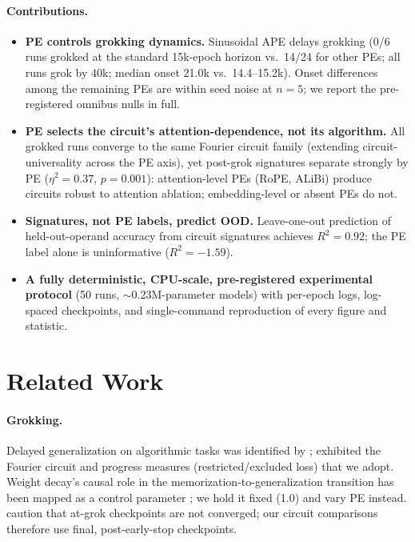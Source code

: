 \documentclass[letterpaper]{article}
\begin{document}
\paragraph{Contributions.}
\begin{itemize}
\item \textbf{PE controls grokking dynamics.} Sinusoidal APE delays grokking
(0/6 runs grokked at the standard 15k-epoch horizon vs.\ 14/24 for other PEs;
all runs grok by 40k; median onset 21.0k vs.\ 14.4--15.2k). Onset differences
among the remaining PEs are within seed noise at $n{=}5$; we report the
pre-registered omnibus nulls in full.
\item \textbf{PE selects the circuit's attention-dependence, not its
algorithm.} All grokked runs converge to the same Fourier circuit family
(extending circuit-universality
\cite{mccracken2025universal,moisescu2025unifying} across the PE axis), yet
post-grok signatures separate strongly by PE ($\eta^2{=}0.37$, $p{=}0.001$):
attention-level PEs (RoPE, ALiBi) produce circuits robust to attention
ablation; embedding-level or absent PEs do not.
\item \textbf{Signatures, not PE labels, predict OOD.} Leave-one-out prediction
of held-out-operand accuracy from circuit signatures achieves $R^2{=}0.92$;
the PE label alone is uninformative ($R^2{=}-1.59$).
\item \textbf{A fully deterministic, CPU-scale, pre-registered experimental
protocol} (50 runs, $\sim$0.23M-parameter models) with per-epoch logs,
log-spaced checkpoints, and single-command reproduction of every figure and
statistic.
\end{itemize}

\section{Related Work}

\paragraph{Grokking.} Delayed generalization on algorithmic tasks was identified
by \citet{power2022grokking}; \citet{nanda2023progress} exhibited the Fourier
circuit and progress measures (restricted/excluded loss) that we adopt.
Weight decay's causal role in the memorization-to-generalization transition has
been mapped as a control parameter \cite{verma2026weight}; we hold it fixed
(1.0) and vary PE instead. \citet{truong2026atgrok} caution that at-grok
checkpoints are not converged; our circuit comparisons therefore use final,
post-early-stop checkpoints.
\end{document}
